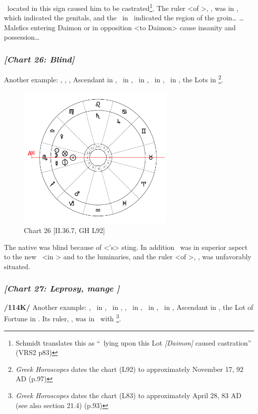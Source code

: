 \noindent \Saturn\, located in this sign caused him to be castrated\footnote{Schmidt translates this as ``\Saturn\, lying upon this Lot \textsl{[Daimon]} caused castration'' (VRS2 p83)}. The ruler <of \Gemini>, \Mercury, was in \Scorpio, which indicated the genitals, and the \Sun\, in \Sagittarius\, indicated the region of the groin\ldots
\ldots Malefics entering Daimon or in opposition <to Daimon> cause insanity and possession\ldots

\newpage
\subsubsection{\textit{[Chart 26: Blind]}}
Another example: \Sun, \Moon, \Mercury, Ascendant in \Scorpio, \Saturn\, in \Leo, \Jupiter\, in \Cancer, \Mars\, in \Capricorn, \Venus\, in \Libra, the Lots in \Scorpio
\footnote{\textit{Greek Horoscopes} dates the chart (L92) to approximately November 17, 92 AD (p.97)}. 

\clearpage
\begin{figure}
\centering
\vspace{-20pt}
\includegraphics[width=0.68\textwidth]{charts/2_36_7}
\caption{Chart 26 [II.36.7, GH L92]}
\label{fig:chart26}
\end{figure}

The native was blind because of <\Scorpio’s> sting. In
addition \Saturn\, was in superior aspect to the new \Moon\, <in \Scorpio> and to the luminaries, and the ruler <of \Scorpio>, \Mars, was unfavorably situated.
\newpage

\subsubsection{\textit{[Chart 27: Leprosy, mange ]}}
\textbf{/114K/} Another example: \Sun, \Mercury\, in \Taurus, \Moon\, in \Aquarius, \Saturn, \Venus\, in \Aries, \Jupiter\, in \Virgo, \Mars\, in \Pisces, Ascendant in \Leo, the Lot of Fortune in \Taurus. Its ruler, \Venus, was in \Aries\, with \Saturn
\footnote{\textit{Greek Horoscopes} dates the chart (L83) to approximately April 28, 83 AD (see also section 21.4) (p.93)}. 

